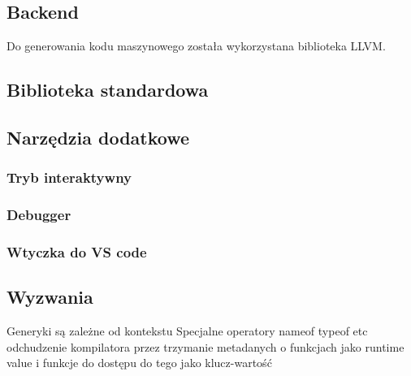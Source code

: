 \subsection{Backend}
\label{implementation:backend}
Do generowania kodu maszynowego została wykorzystana biblioteka LLVM.
\subsection{Biblioteka standardowa}

\subsection{Narzędzia dodatkowe}

\subsubsection{Tryb interaktywny}

\subsubsection{Debugger}

\subsubsection{Wtyczka do VS code}
\subsection{Wyzwania}
Generyki są zależne od kontekstu
Specjalne operatory nameof typeof etc
odchudzenie kompilatora przez trzymanie metadanych o funkcjach jako runtime value i funkcje do dostępu do tego jako klucz-wartość